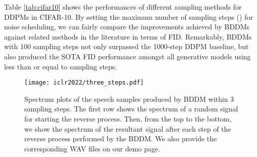Table \ref{tab:cifar10} shows the performances of different sampling methods for DDPMs in CIFAR-10. By setting the maximum number of sampling steps () for noise scheduling, we can fairly compare the improvements achieved by BDDMs against related methods in the literature in terms of FID. Remarkably, BDDMs with 100 sampling steps not only surpassed the 1000-step DDPM baseline, but also produced the SOTA FID performance amongst all generative models using less than or equal to  sampling steps.









\begin{figure}[H]
    \centering
    \texttt{[image: iclr2022/three\_steps.pdf]}
    \caption{Spectrum plots of the speech samples produced by BDDM within 3 sampling steps. The first row shows the spectrum of a random signal for starting the reverse process. Then, from the top to the bottom, we show the spectrum of the resultant signal after each step of the reverse process performed by the BDDM. We also provide the corresponding WAV files on our demo page.}
\end{figure}


